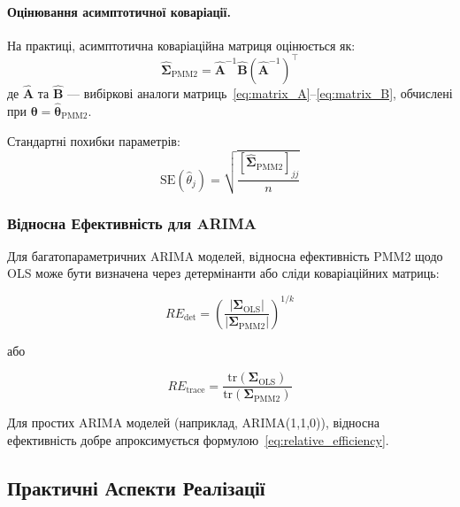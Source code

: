 \documentclass[12pt,a4paper]{article}
\begin{document}
\paragraph{Оцінювання асимптотичної коваріації.}

На практиці, асимптотична коваріаційна матриця оцінюється як:
\begin{equation}
\label{eq:estimated_covariance}
\hat{\boldsymbol{\Sigma}}_{\text{PMM2}} = \hat{\mathbf{A}}^{-1} \hat{\mathbf{B}} (\hat{\mathbf{A}}^{-1})^\top
\end{equation}
де $\hat{\mathbf{A}}$ та $\hat{\mathbf{B}}$ --- вибіркові аналоги матриць~\eqref{eq:matrix_A}--\eqref{eq:matrix_B}, обчислені при $\boldsymbol{\theta} = \hat{\boldsymbol{\theta}}_{\text{PMM2}}$.

Стандартні похибки параметрів:
\begin{equation}
\label{eq:standard_errors}
\text{SE}(\hat{\theta}_j) = \sqrt{\frac{[\hat{\boldsymbol{\Sigma}}_{\text{PMM2}}]_{jj}}{n}}
\end{equation}

\subsubsection{Відносна Ефективність для ARIMA}

Для багатопараметричних ARIMA моделей, відносна ефективність PMM2 щодо OLS може бути визначена через детермінанти або сліди коваріаційних матриць:

\begin{equation}
\label{eq:re_arima_det}
RE_{\text{det}} = \left( \frac{|\boldsymbol{\Sigma}_{\text{OLS}}|}{|\boldsymbol{\Sigma}_{\text{PMM2}}|} \right)^{1/k}
\end{equation}

або

\begin{equation}
\label{eq:re_arima_trace}
RE_{\text{trace}} = \frac{\text{tr}(\boldsymbol{\Sigma}_{\text{OLS}})}{\text{tr}(\boldsymbol{\Sigma}_{\text{PMM2}})}
\end{equation}

Для простих ARIMA моделей (наприклад, ARIMA(1,1,0)), відносна ефективність добре апроксимується формулою~\eqref{eq:relative_efficiency}.

\subsection{Практичні Аспекти Реалізації}
\label{subsec:implementation}
\end{document}
